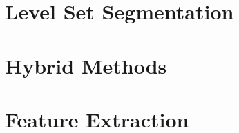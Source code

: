 \clearpage

\section{Level Set Segmentation}
\label{sec:LevelSetsSegmentation}
\ifitkFullVersion 

\fi


\section{Hybrid Methods} 
\label{sec:HybridSegmentationMethods}

\ifitkFullVersion 

\fi


\section{Feature Extraction} 
\label{sec:FeatureExtractionMethods}

\ifitkFullVersion 

\fi


